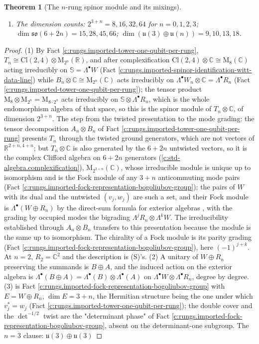 \documentclass[11pt]{article}
\newtheorem{theorem}{Theorem}[section]
\theoremstyle{definition}
\theoremstyle{plain}
\providecommand{\C}{}\renewcommand{\C}{\mathbb{C}}
\providecommand{\Cl}{}\renewcommand{\Cl}{\mathrm{Cl}}
\providecommand{\R}{}\renewcommand{\R}{\mathbb{R}}
\providecommand{\Sp}{}\renewcommand{\Sp}{\mathbb{S}}
\providecommand{\uu}{}\renewcommand{\uu}{\mathfrak{u}}
\begin{document}
\begin{theorem}[The $n$-rung spinor module and its mixings]
\begin{enumerate}
\item The dimension counts: $2^{3+n} = 8, 16, 32, 64$ for $n = 0, 1, 2, 3$; $\dim \mathfrak{so}(6{+}2n) = 15, 28, 45, 66$; $\dim(\uu(3) \oplus \uu(n)) = 9, 10, 13, 18$.
\end{enumerate}
\end{theorem}
\begin{proof}
(1) By Fact \ref{c:rungs.imported-tower-one-qubit-per-rung}, $T_{n} \cong \Cl(2,4) \otimes \mathrm{M}_{2^{n}}(\R)$, and after complexification $\Cl(2,4) \otimes \C \cong \mathrm{M}_{8}(\C)$ acting irreducibly on $\Sp = \Lambda^{\bullet}W$ (Fact \ref{c:rungs.imported-spinor-identification-witt-data-line}) while $B_{n} \otimes \C \cong \mathrm{M}_{2^{n}}(\C)$ acts irreducibly on $\Lambda^{\bullet}W_{n} \otimes \C = \Lambda^{\bullet}R_{n}$ (Fact \ref{c:rungs.imported-tower-one-qubit-per-rung}); the tensor product $\mathrm{M}_{8} \otimes \mathrm{M}_{2^{n}} = \mathrm{M}_{8 \cdot 2^{n}}$ acts irreducibly on $\Sp \otimes \Lambda^{\bullet}R_{n}$, which is the whole endomorphism algebra of that space, so this is the spinor module of $T_{n} \otimes \C$, of dimension $2^{3+n}$. The step from the twisted presentation to the mode grading: the tensor decomposition $A_{n} \otimes B_{n}$ of Fact \ref{c:rungs.imported-tower-one-qubit-per-rung} presents $T_{n}$ through the twisted ground generators, which are not vectors of $\R^{2+n,4+n}$; but $T_{n} \otimes \C$ is also generated by the $6 + 2n$ untwisted vectors, so it is the complex Clifford algebra on $6 + 2n$ generators (\ref{c:std-algebra.complexification}), $\mathrm{M}_{2^{3+n}}(\C)$, whose irreducible module is unique up to isomorphism and is the Fock module of any $3 + n$ anticommuting mode pairs (Fact \ref{c:rungs.imported-fock-representation-bogoliubov-group}); the pairs of $W$ with its dual and the untwisted $(v_{j}, w_{j})$ are such a set, and their Fock module is $\Lambda^{\bullet}(W \oplus R_{n})$ by the direct-sum formula for exterior algebras \cite[App.~B.2]{FultonHarris1991}, with the grading by occupied modes the bigrading $\Lambda^{j}R_{n} \otimes \Lambda^{k}W$. The irreducibility established through $A_{n} \otimes B_{n}$ transfers to this presentation because the module is the same up to isomorphism. The chirality of a Fock module is its parity grading (Fact \ref{c:rungs.imported-fock-representation-bogoliubov-group}), here $(-1)^{j+k}$. At $n = 2$, $R_{2} = \C^{2}$ and the description is (S)'s. (2) A unitary of $W \oplus R_{n}$ preserving the summands is $B \oplus A$, and the induced action on the exterior algebra is $\Lambda^{\bullet}(B \oplus A) = \Lambda^{\bullet}(B) \otimes \Lambda^{\bullet}(A)$ on $\Lambda^{\bullet}W \otimes \Lambda^{\bullet}R_{n}$, degree by degree. (3) is Fact \ref{c:rungs.imported-fock-representation-bogoliubov-group} with $E = W \oplus R_{n}$, $\dim E = 3 + n$, the Hermitian structure being the one under which $v_{j}^{*} = w_{j}$ (Fact \ref{c:rungs.imported-tower-one-qubit-per-rung}); the double cover and the $\det^{-1/2}$ twist are the "determinant phase" of Fact \ref{c:rungs.imported-fock-representation-bogoliubov-group}, absent on the determinant-one subgroup. The $n = 3$ clause: $\uu(3) \oplus \uu(3)$ 
\end{proof}
\end{document}
